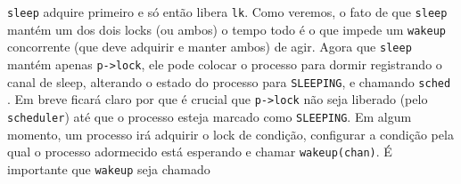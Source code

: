\lstinline{sleep}
adquire primeiro
e só então libera
\lstinline{lk}.
Como veremos, o fato de que
\lstinline{sleep}
mantém um dos dois locks (ou ambos) o tempo todo
é o que impede um
\lstinline{wakeup}
concorrente (que deve adquirir e manter ambos) de agir.
Agora que
\lstinline{sleep}
mantém apenas
\lstinline{p->lock},
ele pode colocar o processo para dormir registrando
o canal de sleep,
alterando o estado do processo para \texttt{SLEEPING},
e chamando
\lstinline{sched}
.
Em breve ficará claro por que é crucial que
\lstinline{p->lock}
não seja liberado (pelo
\lstinline{scheduler}) até que o processo esteja marcado como \texttt{SLEEPING}.
Em algum momento, um processo irá adquirir o lock de condição,
configurar a condição pela qual o processo adormecido está esperando
e chamar \lstinline{wakeup(chan)}.
É importante que \lstinline{wakeup} seja chamado
